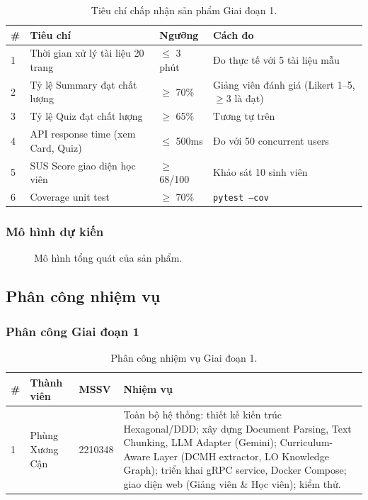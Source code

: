 \begin{table}[H]
    \centering
    \caption{Tiêu chí chấp nhận sản phẩm Giai đoạn 1.}
    \label{tab:product-criteria}
    \begin{tabular}{p{0.5cm}p{5cm}p{3cm}p{6cm}}
        \toprule
        \textbf{\#} & \textbf{Tiêu chí} & \textbf{Ngưỡng} & \textbf{Cách đo} \\
        \midrule
        1 & Thời gian xử lý tài liệu 20 trang & $\leq$ 3 phút
          & Đo thực tế với 5 tài liệu mẫu \\
        2 & Tỷ lệ Summary đạt chất lượng & $\geq$ 70\%
          & Giảng viên đánh giá (Likert 1--5, $\geq$3 là đạt) \\
        3 & Tỷ lệ Quiz đạt chất lượng & $\geq$ 65\%
          & Tương tự trên \\
        4 & API response time (xem Card, Quiz) & $\leq$ 500ms
          & Đo với 50 concurrent users \\
        5 & SUS Score giao diện học viên & $\geq$ 68/100
          & Khảo sát 10 sinh viên \\
        6 & Coverage unit test & $\geq$ 70\%
          & \texttt{pytest --cov} \\
        \bottomrule
    \end{tabular}
\end{table}

\subsubsection{Mô hình dự kiến}

\begin{figure}[H]
    \centering
    \caption{Mô hình tổng quát của sản phẩm.}
    \label{fig:product-model}
\end{figure}

\subsection{Phân công nhiệm vụ}

\subsubsection{Phân công Giai đoạn 1}

\begin{table}[H]
    \centering
    \caption{Phân công nhiệm vụ Giai đoạn 1.}
    \label{tab:task-assign-gd1}
    \begin{tabular}{p{0.5cm}p{4cm}p{2cm}p{8cm}}
        \toprule
        \textbf{\#} & \textbf{Thành viên} & \textbf{MSSV} & \textbf{Nhiệm vụ} \\
        \midrule
        1 & Phùng Xương Cận & 2210348
          & Toàn bộ hệ thống: thiết kế kiến trúc Hexagonal/DDD; xây dựng
            Document Parsing, Text Chunking, LLM Adapter (Gemini); Curriculum-Aware
            Layer (DCMH extractor, LO Knowledge Graph); triển khai gRPC service,
            Docker Compose; giao diện web (Giảng viên \& Học viên); kiểm thử. \\
        \bottomrule
    \end{tabular}
\end{table}

